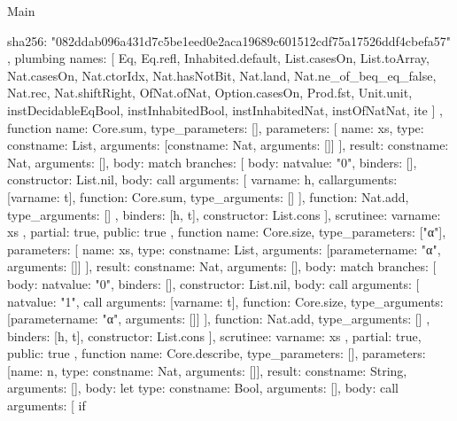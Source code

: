 \begin{lexlean}{Main}
\begin{toolingmodule}
{{{        sha256: "082ddab096a431d7c5be1eed0e2aca19689c601512cdf75a17526ddf4cbefa57"
      }
    },
    plumbing{
      names: [
        Eq,
        Eq.refl,
        Inhabited.default,
        List.casesOn,
        List.toArray,
        Nat.casesOn,
        Nat.ctorIdx,
        Nat.hasNotBit,
        Nat.land,
        Nat.ne_of_beq_eq_false,
        Nat.rec,
        Nat.shiftRight,
        OfNat.ofNat,
        Option.casesOn,
        Prod.fst,
        Unit.unit,
        instDecidableEqBool,
        instInhabitedBool,
        instInhabitedNat,
        instOfNatNat,
        ite
      ]
    },
    function{
      name: Core.sum,
      type_parameters: [],
      parameters: [
        {name: xs, type: const{name: List, arguments: [const{name: Nat, arguments: []}]}}
      ],
      result: const{name: Nat, arguments: []},
      body: match{
        branches: [
          {body: nat{value: "0"}, binders: [], constructor: List.nil},
          {
            body: call{
              arguments: [
                var{name: h},
                call{arguments: [var{name: t}], function: Core.sum, type_arguments: []}
              ],
              function: Nat.add,
              type_arguments: []
            },
            binders: [h, t],
            constructor: List.cons
          }
        ],
        scrutinee: var{name: xs}
      },
      partial: true,
      public: true
    },
    function{
      name: Core.size,
      type_parameters: ["α"],
      parameters: [
        {name: xs, type: const{name: List, arguments: [parameter{name: "α", arguments: []}]}}
      ],
      result: const{name: Nat, arguments: []},
      body: match{
        branches: [
          {body: nat{value: "0"}, binders: [], constructor: List.nil},
          {
            body: call{
              arguments: [
                nat{value: "1"},
                call{
                  arguments: [var{name: t}],
                  function: Core.size,
                  type_arguments: [parameter{name: "α", arguments: []}]
                }
              ],
              function: Nat.add,
              type_arguments: []
            },
            binders: [h, t],
            constructor: List.cons
          }
        ],
        scrutinee: var{name: xs}
      },
      partial: true,
      public: true
    },
    function{
      name: Core.describe,
      type_parameters: [],
      parameters: [{name: n, type: const{name: Nat, arguments: []}}],
      result: const{name: String, arguments: []},
      body: let{
        type: const{name: Bool, arguments: []},
        body: call{
          arguments: [
            if{
}}}}}
\end{toolingmodule}
\end{lexlean}
